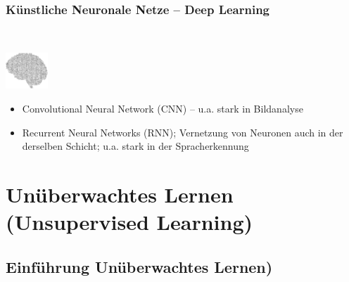 \documentclass[aspectratio=169]{beamer}
\begin{document}
\begin{frame}
  \frametitle{Künstliche Neuronale Netze -- Deep Learning}
  \begin{block}{}
    \vspace{0.5cm}
    \ \ \ \
    \begin{minipage}{0.05\textwidth}
      \includegraphics[width=1.6cm]{images/publicdomainvectors_Random-Alphabet-Brain.pdf}
    \end{minipage}
    \hfill
    \begin{minipage}{0.8\textwidth}
      \begin{itemize}
      \item Convolutional Neural Network (CNN) -- u.a. stark in
        Bildanalyse
      \item Recurrent Neural Networks (RNN); Vernetzung von Neuronen
        auch in der derselben Schicht; u.a. stark in der Spracherkennung        
      \end{itemize}
    \end{minipage}
    \vspace{0.3cm}
  \end{block}
\end{frame}



\section{Unüberwachtes Lernen (Unsupervised Learning)}

\setcounter{tocdepth}{1}
\begin{frame}{}
   \tableofcontents[currentsection]
\end{frame}

\subsection{Einführung Unüberwachtes Lernen)}
\end{document}
